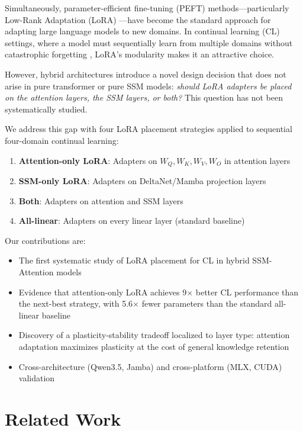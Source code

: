 \documentclass{article}
\begin{document}
Simultaneously, parameter-efficient fine-tuning (PEFT) methods---particularly Low-Rank Adaptation (LoRA) \cite{hu2022lora}---have become the standard approach for adapting large language models to new domains. In continual learning (CL) settings, where a model must sequentially learn from multiple domains without catastrophic forgetting \cite{mccloskey1989catastrophic}, LoRA's modularity makes it an attractive choice.

However, hybrid architectures introduce a novel design decision that does not arise in pure transformer or pure SSM models: \emph{should LoRA adapters be placed on the attention layers, the SSM layers, or both?} This question has not been systematically studied.

We address this gap with four LoRA placement strategies applied to sequential four-domain continual learning:
\begin{enumerate}
    \item \textbf{Attention-only LoRA}: Adapters on $W_Q, W_K, W_V, W_O$ in attention layers
    \item \textbf{SSM-only LoRA}: Adapters on DeltaNet/Mamba projection layers
    \item \textbf{Both}: Adapters on attention and SSM layers
    \item \textbf{All-linear}: Adapters on every linear layer (standard baseline)
\end{enumerate}

Our contributions are:
\begin{itemize}
    \item The first systematic study of LoRA placement for CL in hybrid SSM-Attention models
    \item Evidence that attention-only LoRA achieves 9$\times$ better CL performance than the next-best strategy, with 5.6$\times$ fewer parameters than the standard all-linear baseline
    \item Discovery of a plasticity-stability tradeoff localized to layer type: attention adaptation maximizes plasticity at the cost of general knowledge retention
    \item Cross-architecture (Qwen3.5, Jamba) and cross-platform (MLX, CUDA) validation
\end{itemize}

\section{Related Work}
\end{document}
